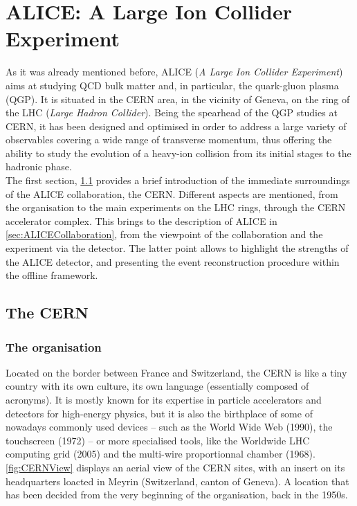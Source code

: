 \newpage
\chapter{ALICE: A Large Ion Collider Experiment}
\label{chap:ALICE}

As it was already mentioned before, ALICE (\textit{A Large Ion Collider Experiment})  aims at studying QCD bulk matter and, in particular, the quark-gluon plasma (QGP). It is situated in the CERN area, in the vicinity of Geneva, on the ring of the LHC (\textit{Large Hadron Collider}). Being the spearhead of the QGP studies at CERN, it has been designed and optimised in order to address a large variety of observables covering a wide range of transverse momentum, thus offering the ability to study the evolution of a heavy-ion collision from its initial stages to the hadronic phase.\\

The first section, \Sec\ref{sec:CERN} provides a brief introduction of the immediate surroundings of the ALICE collaboration, the CERN. Different aspects are mentioned, from the organisation to the main experiments on the LHC rings, through the CERN accelerator complex. This brings to the description of ALICE in \Sec\ref{sec:ALICECollaboration}, from the viewpoint of the collaboration and the experiment via the detector. The latter point allows to highlight the strengths of the ALICE detector, and presenting the event reconstruction procedure within the offline framework.


\section{The CERN}
\label{sec:CERN}

\subsection{The organisation}

Located on the border between France and Switzerland, the CERN is like a tiny country with its own culture, its own language (essentially composed of acronyms). It is mostly known for its expertise in particle accelerators and detectors for high-energy physics, but it is also the birthplace of some of nowadays commonly used devices -- such as the World Wide Web (1990), the touchscreen (1972) -- or more specialised tools, like the Worldwide LHC computing grid (2005) and the multi-wire proportionnal chamber (1968). \Fig\ref{fig:CERNView} displays an aerial view of the CERN sites, with an insert on its headquarters loacted in Meyrin (Switzerland, canton of Geneva). A location that has been decided from the very beginning of the organisation, back in the 1950s.\\

